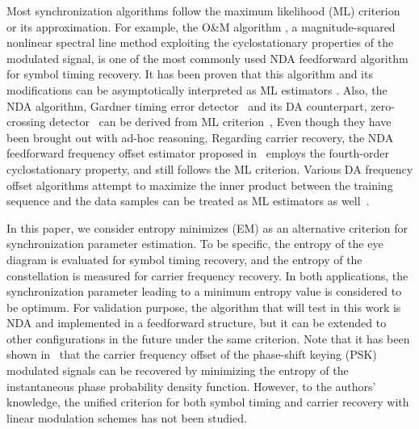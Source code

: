 \documentclass[journal,comsoc]{IEEEtran}
\begin{document}

Most synchronization algorithms follow the maximum likelihood (ML) criterion or its approximation.
For example, the O\&M algorithm \cite{Oerder1988}, a magnitude-squared nonlinear spectral line method exploiting the cyclostationary properties of the modulated signal, is one of the most commonly used NDA feedforward algorithm for symbol timing recovery.
It has been proven that this algorithm and its modifications can be asymptotically interpreted as ML estimators \cite{YanWang2002,Lopez-Salcedo2006}.
Also, the NDA algorithm, Gardner timing error detector~\cite{Gardner1986} and its DA counterpart, zero-crossing detector~\cite{gardner1988demodulator} can be derived from ML criterion~\cite{Oerder1987DerivationPrinciple},
Even though they have been brought out with ad-hoc reasoning,
Regarding carrier recovery, the NDA feedforward frequency offset estimator proposed in~\cite{Wang2004} employs the fourth-order cyclostationary property, and still follows the ML criterion.
Various DA frequency offset algorithms attempt to maximize the inner product between the  training sequence and the data samples can be treated as ML estimators as well~\cite{mengali1997synchronization}.

In this paper, we consider entropy minimizes (EM) as an alternative criterion for synchronization parameter estimation.
To be specific, the entropy of the eye diagram is evaluated for symbol timing recovery, and the entropy of the constellation is measured for carrier frequency recovery.
In both applications, the synchronization parameter leading to a minimum entropy value is considered to be optimum.
For validation purpose, the algorithm that will test in this work is NDA and implemented in a feedforward structure, but it can be extended to other configurations in the future under the same criterion.
Note that it has been shown in~\cite{Pedzisz2006} that the carrier frequency offset of the phase-shift keying (PSK) modulated signals can be recovered by minimizing the entropy of the instantaneous phase probability density function.
However, to the authors' knowledge,  the unified criterion for both symbol timing and carrier recovery with linear modulation schemes has not been studied.
\end{document}
